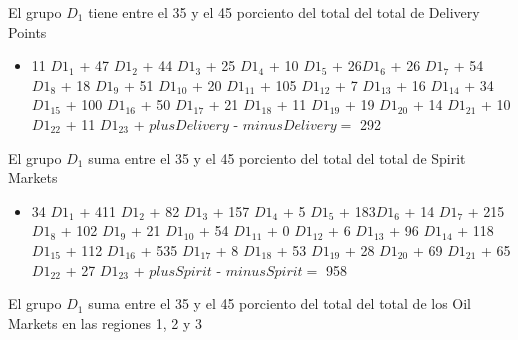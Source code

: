 
El grupo $D_1$ tiene entre el 35 y el 45 porciento del total del total de Delivery Points \\
\begin{itemize}
\item 11 ${D1}_1$ + 47 ${D1}_2$ + 44 ${D1}_3$ + 25 ${D1}_4$ + 10 ${D1}_5$ + 26${D1}_6$ + 26 ${D1}_7$ + 54 ${D1}_8$ + 18 ${D1}_9$ + 51 ${D1}_{10}$ + 20 ${D1}_{11}$ + 105 ${D1}_{12}$ + 7 ${D1}_{13}$ + 16 ${D1}_{14}$ + 34 ${D1}_{15}$ + 100 ${D1}_{16}$ + 50 ${D1}_{17}$ + 21 ${D1}_{18}$ + 11 ${D1}_{19}$ + 19 ${D1}_{20}$ + 14 ${D1}_{21}$ + 10 ${D1}_{22}$ + 11 ${D1}_{23}$ + $plusDelivery$ - $minusDelivery = $ 292 \\
\end{itemize}
El grupo $D_1$ suma entre el 35 y el 45 porciento del total del total de Spirit Markets \\
\begin{itemize}
\item 34 ${D1}_1$ + 411 ${D1}_2$ + 82 ${D1}_3$ + 157 ${D1}_4$ + 5 ${D1}_5$ + 183${D1}_6$ + 14 ${D1}_7$ + 215 ${D1}_8$ + 102 ${D1}_9$ + 21 ${D1}_{10}$ + 54 ${D1}_{11}$ + 0 ${D1}_{12}$ + 6 ${D1}_{13}$ + 96 ${D1}_{14}$ + 118 ${D1}_{15}$ + 112 ${D1}_{16}$ + 535 ${D1}_{17}$ + 8 ${D1}_{18}$ + 53 ${D1}_{19}$ + 28 ${D1}_{20}$ + 69 ${D1}_{21}$ + 65 ${D1}_{22}$ + 27 ${D1}_{23}$ + $plusSpirit$ - $minusSpirit = $ 958 \\
\end{itemize}
El grupo $D_1$ suma entre el 35 y el 45 porciento del total del total de los Oil Markets en las regiones 1, 2 y 3 \\

